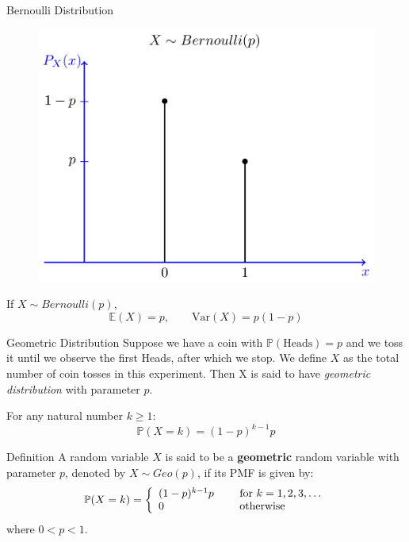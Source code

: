 \documentclass{beamer}
\newcommand{\E}{\mathbb{E}}
\newcommand{\PP}{\mathbb{P}}
\newcommand{\Var}{\text{Var}}
\begin{document}
	
	
	\begin{frame}{Bernoulli Distribution}
	\begin{figure}
		\centering
		\includegraphics[width=0.6\linewidth]{0.36}
		\label{fig:0}
	\end{figure}
	\pause
%	
If $X\sim Bernoulli(p)$,
\[ \E(X) = p,\qquad \Var(X)=p(1-p) \]
	\end{frame}
	
	
	\begin{frame}{Geometric Distribution}
		Suppose we have a coin with $\PP(\text{Heads})=p$ and we toss it until we observe the first Heads, after which we stop. We define $X$
		as the total number of coin tosses in this experiment. Then X
		is said to have \textit{geometric distribution} with parameter $p$. 
		\pause
		
		For any natural number $k\ge 1$:
		\[\PP(X=k)=(1-p)^{k-1} p\] \pause		\begin{block}{Definition}
		A random variable $X$ is said to be a \textbf{geometric} random variable with parameter $p$, denoted by $X\sim Geo(p)$, if its PMF is given by:
	\begin{equation}
		\nonumber \PP(X=k) = \left\{
		\begin{array}{l l}
			(1-p)^{k-1} p& \quad \text{ for } k=1,2,3,\dots\\
			0 & \quad \text{ otherwise}
		\end{array} \right.
	\end{equation}
	where $0<p<1$.
		\end{block}
		
	\end{frame}
	
\end{document}
